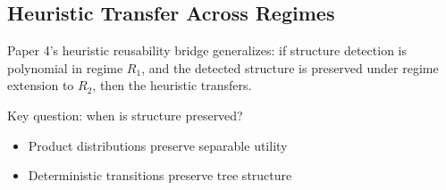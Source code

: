 
\subsection{Heuristic Transfer Across Regimes}

Paper 4's heuristic reusability bridge generalizes: if structure detection is polynomial in regime $R_1$, and the detected structure is preserved under regime extension to $R_2$, then the heuristic transfers.

Key question: when is structure preserved?
\begin{itemize}
\item Product distributions preserve separable utility
\item Deterministic transitions preserve tree structure
\end{itemize}
